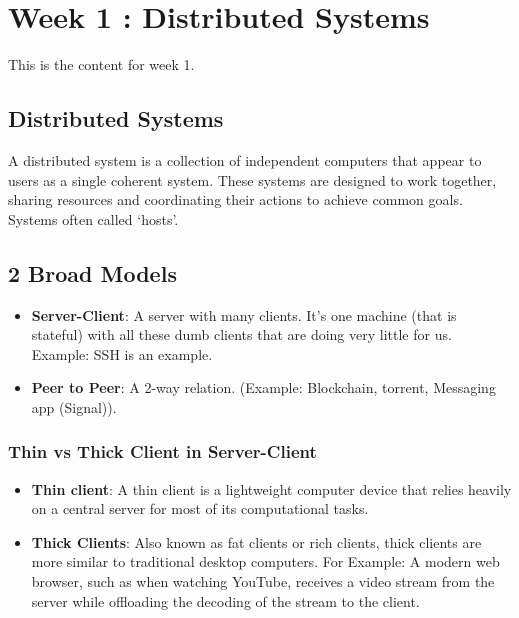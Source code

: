 \section{Week 1 : Distributed Systems}

This is the content for week 1.

\setcounter{subsection}{0}

\subsection{Distributed Systems}
A distributed system is a collection of independent computers that appear to users as a single coherent system. These systems are designed to work together, sharing resources and coordinating their actions to achieve common goals. Systems often called ‘hosts’.

\subsection{2 Broad Models}
\begin{itemize}[noitemsep, topsep=4pt]
    \item \textbf{Server-Client}: A server with many clients. It's one machine (that is stateful) with all these dumb clients that are doing very little for us. Example: SSH is an example.
    \item \textbf{Peer to Peer}: A 2-way relation. (Example: Blockchain, torrent, Messaging app (Signal)).
\end{itemize}

\subsubsection{Thin vs Thick Client in Server-Client}
\begin{itemize}[noitemsep,  leftmargin=*,label=, topsep=1pt] 
	\item \textbf{Thin client}: A thin client is a lightweight computer device that relies heavily on a central server for most of its computational tasks. \\
	\item \textbf{Thick Clients}: Also known as fat clients or rich clients, thick clients are more similar to traditional desktop computers. For Example: A modern web browser, such as when watching YouTube, receives a video stream from the server while offloading the decoding of the stream to the client.
\end{itemize}

